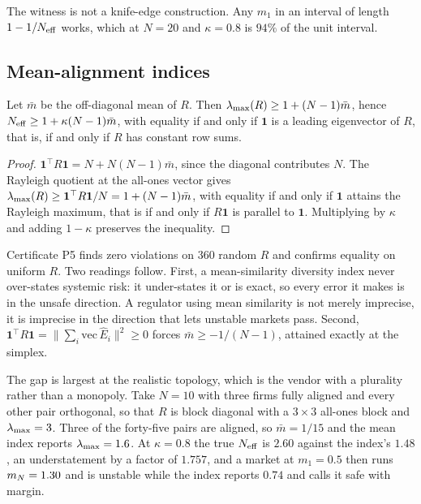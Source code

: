 The witness is not a knife-edge construction. Any $m_1$ in an interval of length $1 - 1/N_{\mathrm{eff}}$ works, which at $N = 20$ and $\kappa = 0.8$ is $94\%$ of the unit interval.

\subsection{Mean-alignment indices}

\begin{aproposition}
\label{aprop:mean}
Let $\bar{m}$ be the off-diagonal mean of $R$. Then $\lambda_{\max}(R) \geq 1 + (N-1)\bar{m}$, hence $N_{\mathrm{eff}} \geq 1 + \kappa(N-1)\bar{m}$, with equality if and only if $\mathbf{1}$ is a leading eigenvector of $R$, that is, if and only if $R$ has constant row sums.
\end{aproposition}

\begin{proof}
$\mathbf{1}^{\top}R\mathbf{1} = N + N(N-1)\bar{m}$, since the diagonal contributes $N$. The Rayleigh quotient at the all-ones vector gives $\lambda_{\max}(R) \geq \mathbf{1}^{\top}R\mathbf{1}/N = 1 + (N-1)\bar{m}$, with equality if and only if $\mathbf{1}$ attains the Rayleigh maximum, that is if and only if $R\mathbf{1}$ is parallel to $\mathbf{1}$. Multiplying by $\kappa$ and adding $1-\kappa$ preserves the inequality.
\end{proof}

Certificate P5 finds zero violations on 360 random $R$ and confirms equality on uniform $R$. Two readings follow. First, a mean-similarity diversity index never over-states systemic risk: it under-states it or is exact, so every error it makes is in the unsafe direction. A regulator using mean similarity is not merely imprecise, it is imprecise in the direction that lets unstable markets pass. Second, $\mathbf{1}^{\top}R\mathbf{1} = \|\sum_i \mathrm{vec}\,\hat{E}_i\|^2 \geq 0$ forces $\bar{m} \geq -1/(N-1)$, attained exactly at the simplex.

The gap is largest at the realistic topology, which is the vendor with a plurality rather than a monopoly. Take $N=10$ with three firms fully aligned and every other pair orthogonal, so that $R$ is block diagonal with a $3\times 3$ all-ones block and $\lambda_{\max} = 3$. Three of the forty-five pairs are aligned, so $\bar{m} = 1/15$ and the mean index reports $\lambda_{\max} = 1.6$. At $\kappa = 0.8$ the true $N_{\mathrm{eff}}$ is $2.60$ against the index's $1.48$, an understatement by a factor of $1.757$, and a market at $m_1 = 0.5$ then runs $m_N = 1.30$ and is unstable while the index reports $0.74$ and calls it safe with margin.

